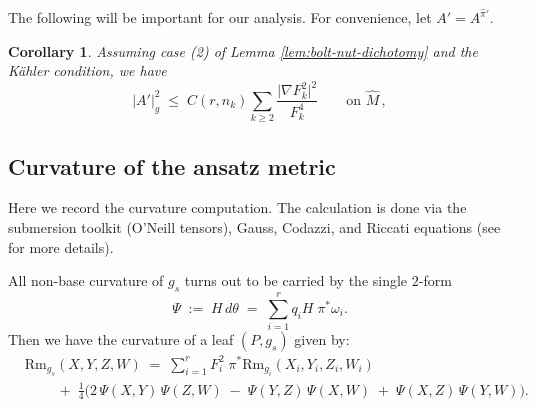 \documentclass[11pt]{amsart}
\theoremstyle{plain}
\numberwithin{equation}{section}
\newtheorem{corollary}[theorem]{Corollary}
\theoremstyle{definition}
\theoremstyle{remark}
\begin{document}


The following will be important for our analysis. For convenience, let $A'=A^{\widehat{\pi}'}$.
\begin{corollary}\label{cor:norm-A-residual}
	Assuming case (2) of Lemma \ref{lem:bolt-nut-dichotomy} and the K\"{a}hler condition, we have
	\begin{equation}\label{eq:norm-A-residual}
		\big| A' \big|^2_g \;\leq\; C ( r, n_k ) \sum_{k \geq 2} \frac{\big| \nabla F_k^2 \big|^2}{F_k^4} \qquad \text{on } \widehat{M} \,,
	\end{equation}
\end{corollary}









\subsection{Curvature of the ansatz metric}\label{subsec:curvature}
Here we record the curvature computation. The calculation is done via the submersion toolkit (O'Neill tensors), Gauss, Codazzi, and Riccati equations (see \cite{FT} for more details).

All non-base curvature of $g_s$ turns out to be carried by the single $2$-form
\begin{equation}\label{eq:Psi}
	\Psi \;:=\; H\, d\theta \;=\; \sum_{i=1}^r q_i H\; \pi^*\omega_i. %
\end{equation}
Then we have the curvature of a leaf $(P, g_s)$ given by:
\begin{equation}\label{eq:leaf-curvature}
	\begin{aligned}
		&\mathrm{Rm}_{g_s}(X, Y, Z, W) \;=\; \sum_{i=1}^r F_i^2\; \pi^*\mathrm{Rm}_{g_i}(X_i, Y_i, Z_i, W_i) \\
		&\qquad \;+\; \frac{1}{4}\Big( 2\, \Psi(X,Y)\, \Psi(Z,W) \;-\; \Psi(Y,Z)\, \Psi(X,W) \;+\; \Psi(X,Z)\, \Psi(Y,W) \Big).
	\end{aligned}
\end{equation}
\end{document}
